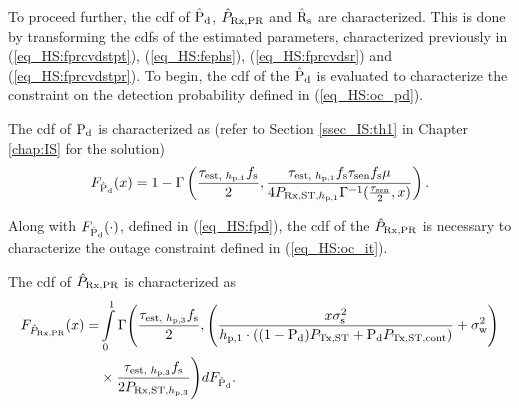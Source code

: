 To proceed further, the cdf of $\hat{\text{P}}_{\text{d}}$, $\hat{P}_{\text{Rx,PR}}$ and $\hat{\text{{R}}}_{\text{s}}$ are characterized. This is done by transforming the cdfs of the estimated parameters, characterized previously in (\ref{eq_HS:fprcvdstpt}), (\ref{eq_HS:fephs}), (\ref{eq_HS:fprcvdsr}) and (\ref{eq_HS:fprcvdstpr}). To begin, the cdf of the $\hat{\text{P}}_{\text{d}}$ is evaluated to characterize the constraint on the detection probability defined in (\ref{eq_HS:oc_pd}). 
\begin{lemma} \label{lm_HS:lem1}
\normalfont
The cdf of $\text{P}_{\text{d}}$ is characterized as (refer to Section \ref{ssec_IS:th1} in Chapter \ref{chap:IS} for the solution) 
\begin{align}
F_{\hat{\text{P}}_{\text{d}}}(x) = 1 - \Gamma \left(\frac{\tau_{\text{est, $h_{\text{p,1}}$}} f_{\text{s}}}{2}, \frac{\tau_{\text{est, $h_{\text{p,1}}$}} f_{\text{s}} \tau_{\text{sen}} f_{\text{s}} \mu}{4 P_{\text{Rx,ST,$h_{\text{p,1}}$}} \Gamma^{-1}(\frac{\tau_{\text{sen}}}{2}, x) } \right). 
\label{eq_HS:fpd}
\end{align}
\end{lemma}
Along with $F_{\hat{\text{P}}_{\text{d}}}(\cdot)$, defined in (\ref{eq_HS:fpd}), the cdf of the $\hat{P}_{\text{Rx,PR}}$ is necessary to characterize the outage constraint defined in (\ref{eq_HS:oc_it}). 
\begin{lemma} \label{lm_HS:lem2}
\normalfont
The cdf of $\hat{P}_{\text{Rx,PR}}$ is characterized as 
\begin{align}
F_{\hat{P}_{\text{Rx,PR}}} (x) =&  
\int\limits_0^1 \Gamma \Bigg(\frac{\tau_{\text{est, $h_{\text{p,3}}$}} f_{\text{s}}}{2} , \Bigg( \frac{x \sigma^2_{\text{s}}}{h_{\text{p,1}} \cdot ((1 - \text{P}_{\text{d}}) P_{\text{Tx,ST}} + \text{P}_{\text{d}} P_{\text{Tx,ST,cont}})} + \sigma^2_{\text{w}}  \Bigg) \nonumber \\ 
& \times  \frac{\tau_{\text{est, $h_{\text{p,3}}$}} f_{\text{s}}}{2 P_{\text{Rx,ST,$h_{\text{p,3}}$}}}  \Bigg) dF_{\hat{\text{P}}_{\text{d}}}. 
\label{eq_HS:fprcvdpr}
\end{align}
\end{lemma}

